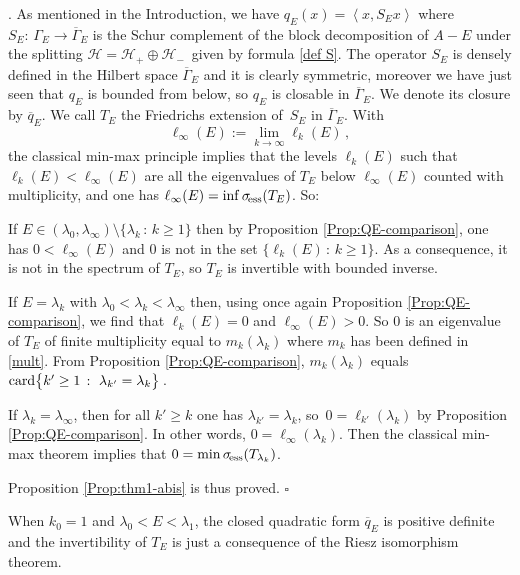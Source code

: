 \documentclass[12pt,reqno]{amsart}
\newcommand{\innerproduct}[2]{\left\langle #1, #2 \right\rangle}
\renewcommand{\(}{\left(}
\renewcommand{\)}{\right)}
\newcommand{\finprf}{\null\hfill$\square$\vskip 0.3cm}
\begin{document}
. 
As mentioned in the Introduction, we have $q_E(x)=\innerproduct{x}{S_Ex}$ where $S_E:\, \Gamma_E\to \overline \Gamma_E$ is the Schur complement of the block decomposition of $A-E$ under the splitting $\mathcal H=\mathcal H_+\oplus\mathcal H_-\,$ given by formula \eqref{def S}.
 The operator $S_E$ is densely defined in the Hilbert space $\overline \Gamma_E$ and it is clearly symmetric, moreover we have just seen that $q_E$ is bounded from below, so $q_E$ is closable in $\overline \Gamma_E$. We denote its closure by $\overline q_E$. We call $T_E$ the Friedrichs extension of~$S_E$ in $\overline \Gamma_E$. With
\[\ell_\infty(E):=\lim_{k\to\infty} \ell_k(E)\,,\]
the classical min-max principle implies that the levels $\ell_k(E)$ such that $\ell_k(E)<\ell_\infty(E)$ are all the eigenvalues of $T_E$ below $\ell_\infty(E)$ counted with multiplicity, and one has $\ell_\infty(E)=\inf \sigma_{\!\rm ess}(T_E)$. So:

If $E\in (\lambda_0,\lambda_\infty)\setminus\{\lambda_k\,:\, k\geq 1\}$ then by Proposition \ref{Prop:QE-comparison},  one has $0<\ell_\infty(E)$ and $0$ is not in the set $\{\ell_k(E)\,:\, k\geq 1\}$. As a consequence, it is not in the spectrum of $T_E$, so $T_E$ is invertible with bounded inverse.

If $E=\lambda_k$ with $\lambda_0<\lambda_k<\lambda_\infty$ then, using once again Proposition \ref{Prop:QE-comparison}, we find that $\ell_k(E)=0$ and $\ell_\infty(E)>0$. So $0$ is an eigenvalue of $T_E$ of finite multiplicity equal to $m_k(\lambda_k)$ where $m_k$ has been defined in \eqref{mult}. From Proposition \ref{Prop:QE-comparison}, $m_k(\lambda_k)$ equals ${\rm card} \bigl\{ k'
\ge 1 \,:\, \,\lambda_{k'} = \lambda_k \bigr\} \,$.

If $\lambda_k=\lambda_\infty$, then for all $k'\geq k$ one has $\lambda_{k'}=\lambda_k$, so $\,0=\ell_{k'}(\lambda_k)$ by Proposition \ref{Prop:QE-comparison}. In other words, $0=\ell_\infty(\lambda_k)$. Then the classical min-max theorem implies that $0=\min\sigma_{\!\rm ess}(T_{\lambda_k})$.

\noindent Proposition \ref{Prop:thm1-abis} is thus proved.
\finprf

\begin{remark}\label{k0=1} When $k_0=1$ and $\lambda_0<E<\lambda_1$, the closed quadratic form $\overline{q}_E$ is positive definite and the invertibility of $T_E$ is just a consequence of the Riesz isomorphism theorem.\end{remark}
\end{document}
